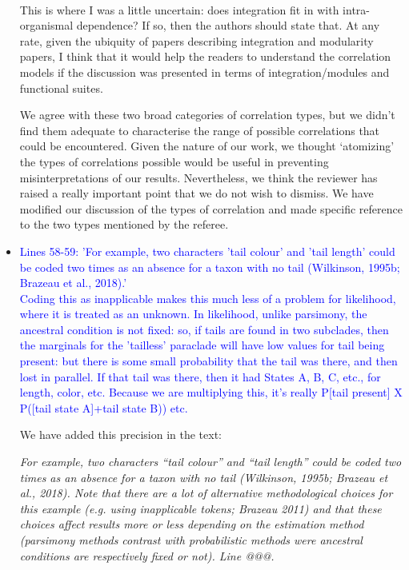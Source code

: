 \documentclass[12pt,letterpaper]{article}
\begin{document}
\begin{itemize}
{{\\
This is where I was a little uncertain: does integration fit in with intra-organismal dependence? If so, then the authors should state that. At any rate, given the ubiquity of papers describing integration and modularity papers, I think that it would help the readers to understand the correlation models if the discussion was presented in terms of integration/modules and functional suites.}}


We agree with these two broad categories of correlation types, but we didn’t find them adequate to characterise the range of possible correlations that could be encountered.
Given the nature of our work, we thought ‘atomizing’ the types of correlations possible would be useful in preventing misinterpretations of our results.
Nevertheless, we think the reviewer has raised a really important point that we do not wish to dismiss.
We have modified our discussion of the types of correlation and made specific reference to the two types mentioned by the referee.

\item{\textcolor{blue}{Lines 58-59: 'For example, two characters 'tail colour' and 'tail length' could be coded two times as an absence for a taxon with no tail (Wilkinson, 1995b; Brazeau et al., 2018).'
\\
Coding this as inapplicable makes this much less of a problem for likelihood, where it is treated as an unknown. In likelihood, unlike parsimony, the ancestral condition is not fixed: so, if tails are found in two subclades, then the marginals for the 'tailless' paraclade will have low values for tail being present: but there is some small probability that the tail was there, and then lost in parallel. If that tail was there, then it had States A, B, C, etc., for length, color, etc. Because we are multiplying this, it's really P[tail present] X P([tail state A]+tail state B)) etc.}}

We have added this precision in the text:

\textit{For example, two characters ``tail colour'' and ``tail length'' could be coded two times as an absence for a taxon with no tail (Wilkinson, 1995b; Brazeau et al., 2018). Note that there are a lot of alternative methodological choices for this example (e.g. using inapplicable tokens; Brazeau 2011) and that these choices affect results more or less depending on the estimation method (parsimony methods contrast with probabilistic methods were ancestral conditions are respectively fixed or not). Line @@@.}


\end{itemize}
\end{document}
